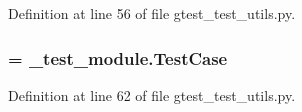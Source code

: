 \-Definition at line 56 of file gtest\-\_\-test\-\_\-utils.\-py.

\hypertarget{namespacegtest__test__utils_a61fe0349d692eb6d4f5b94e35049b2e9}{
\subsubsection[{\-Test\-Case}]{ = \-\_\-test\-\_\-module.\-Test\-Case}}\label{d2/d4a/namespacegtest__test__utils_a61fe0349d692eb6d4f5b94e35049b2e9}


\-Definition at line 62 of file gtest\-\_\-test\-\_\-utils.\-py.

